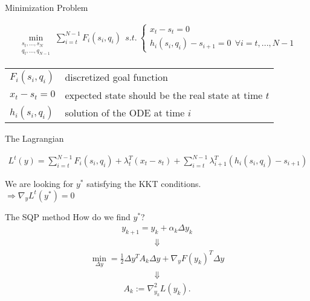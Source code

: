 \begin{frame}{Minimization Problem}
\begin{block}{ }
\begin{align*}
  \min_{\begin{array}{c} s_{t},...,s_{N}\\ q_{t},...,q_{N-1} \end{array}} \sum_{i=t}^{N-1} F_{i}(s_{i},q_{i}) \ \  
  s.t. \ \left\lbrace \begin{array}{c}
  x_{t} - s_{t} = 0 \\
  h_i (s_i ,q_i ) - s_{i+1} = 0 \ \ \forall i = t, ... , N-1 \end{array} \right. 
\end{align*}
\end{block}
\begin{tabular}{l l}
  $F_i(s_i, q_i)$ &  discretized goal function \\
$x_t - s_t = 0$ & expected state should be the real state at time $t$ \\
$h_i (s_i ,q_i )$ & solution of the ODE at time $i$ \\
\end{tabular}
\end{frame}

\begin{frame}{The Lagrangian}
\begin{block}{ }
\begin{align*}
  L^{t}(y) = \sum_{i=t}^{N-1} F_{i}(s_{i},q_{i})
  + \lambda_{t}^{T}(x_{t} - s_{t})
  + \sum_{i=t}^{N-1} \lambda_{i+1}^{T} (h_i (s_i ,q_i ) - s_{i+1})
\end{align*}
\end{block}
\begin{center}
We are looking for $y^*$ satisfying the KKT conditions. \\

$\Rightarrow \nabla_{y} L^{t}(y^*)  = 0 $ 

\end{center}
\end{frame}

\begin{frame}{The SQP method}
How do we find $y^*$?
\begin{align*}
  y_{k+1} = y_{k} + \alpha_{k} \Delta y_{k}
\end{align*}
\begin{align*}
\Downarrow
\end{align*}
\begin{align*}
\min_{\Delta y} = \frac{1}{2} \Delta y^T A_k \Delta y + \nabla_y F(y_k)^T \Delta y
\end{align*}
\begin{align*}
\Downarrow
\end{align*}
\begin{align*}
A_{k} := \nabla^{2}_{y_k} L(y_k).
\end{align*}
  
\end{frame}

